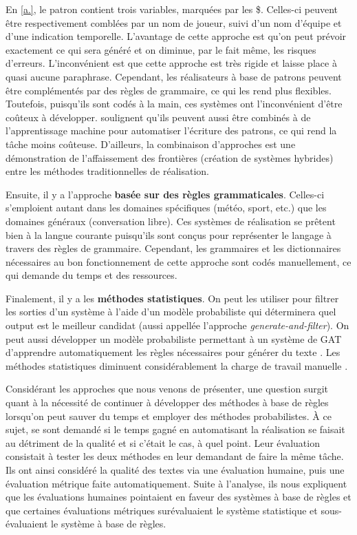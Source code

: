 En \ref{a.}, le patron contient trois variables, marquées par les \$. Celles-ci peuvent être respectivement comblées par un nom de joueur, suivi d'un nom d'équipe et d'une indication temporelle. L'avantage de cette approche est qu'on peut prévoir exactement ce qui sera généré et on diminue, par le fait même, les risques d'erreurs. L'inconvénient est que cette approche est très rigide et laisse place à quasi aucune paraphrase. Cependant, les réalisateurs à base de patrons peuvent être complémentés par des règles de grammaire, ce qui les rend plus flexibles. Toutefois, puisqu'ils sont codés à la main, ces systèmes ont l'inconvénient d'être coûteux à développer. \cite{gatt18} soulignent qu'ils peuvent aussi être combinés à de l'apprentissage machine pour automatiser l'écriture des patrons, ce qui rend la tâche moins coûteuse. D'ailleurs, la combinaison d'approches est une démonstration de l'affaissement des frontières (création de systèmes hybrides) entre les méthodes traditionnelles de réalisation.

Ensuite, il y a l'approche \textbf{basée sur des règles grammaticales}. Celles-ci s'emploient autant dans les domaines spécifiques (météo, sport, etc.) que les domaines généraux (conversation libre). Ces systèmes de réalisation se prêtent bien à la langue courante puisqu'ils sont conçus pour représenter le langage à travers des règles de grammaire. Cependant, les grammaires et les dictionnaires nécessaires au bon fonctionnement de cette approche sont codés manuellement, ce qui demande du temps et des ressources.

Finalement, il y a les \textbf{méthodes statistiques}. On peut les utiliser pour filtrer les sorties d'un système à l'aide d'un modèle probabiliste qui déterminera quel output est le meilleur candidat \citep{LangkildeForestbasedStatisticalSentence2000} (aussi appellée l'approche \emph{generate-and-filter}). On peut aussi développer un modèle probabiliste permettant à un système de \ac{GAT} d'apprendre automatiquement les règles nécessaires pour générer du texte \citep{WhiteMinimalDependencyLength2012}. Les méthodes statistiques diminuent considérablement la charge de travail manuelle \citep{LangkildeForestbasedStatisticalSentence2000}.

Considérant les approches que nous venons de présenter, une question surgit quant à la nécessité de continuer à développer des méthodes à base de règles lorsqu'on peut sauver du temps et employer des méthodes probabilistes. À ce sujet, \cite{BelzSystemBuildingCost2009} se sont demandé si le temps gagné en automatisant la réalisation se faisait au détriment de la qualité et si c'était le cas, à quel point. Leur évaluation consistait à tester les deux méthodes en leur demandant de faire la même tâche. Ils ont ainsi considéré la qualité des textes via une évaluation humaine, puis une évaluation métrique faite automatiquement. Suite à l'analyse, ils nous expliquent que les évaluations humaines pointaient en faveur des systèmes à base de règles et que certaines évaluations métriques surévaluaient le système statistique et sous-évaluaient le système à base de règles.

